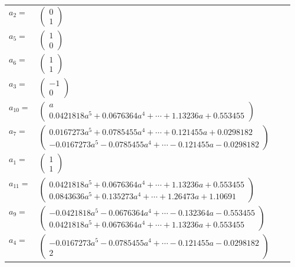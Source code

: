 \documentclass[1p]{elsarticle_modified}
\theoremstyle{definition}
\begin{document}
\begin{tabular}{m{7pt} m{180pt} m{7pt} m{180pt} }
\flushright $a_{2}=$&$\begin{pmatrix}0\\1\end{pmatrix}$ \\
\flushright $a_{5}=$&$\begin{pmatrix}1\\0\end{pmatrix}$ \\
\flushright $a_{6}=$&$\begin{pmatrix}1\\1\end{pmatrix}$ \\
\flushright $a_{3}=$&$\begin{pmatrix}-1\\0\end{pmatrix}$ \\
\flushright $a_{10}=$&$\begin{pmatrix}a\\0.0421818 a^{5}+0.0676364 a^{4}+\cdots+1.13236 a+0.553455\end{pmatrix}$ \\
\flushright $a_{7}=$&$\begin{pmatrix}0.0167273 a^{5}+0.0785455 a^{4}+\cdots+0.121455 a+0.0298182\\-0.0167273 a^{5}-0.0785455 a^{4}+\cdots-0.121455 a-0.0298182\end{pmatrix}$ \\
\flushright $a_{1}=$&$\begin{pmatrix}1\\1\end{pmatrix}$ \\
\flushright $a_{11}=$&$\begin{pmatrix}0.0421818 a^{5}+0.0676364 a^{4}+\cdots+1.13236 a+0.553455\\0.0843636 a^{5}+0.135273 a^{4}+\cdots+1.26473 a+1.10691\end{pmatrix}$ \\
\flushright $a_{9}=$&$\begin{pmatrix}-0.0421818 a^{5}-0.0676364 a^{4}+\cdots-0.132364 a-0.553455\\0.0421818 a^{5}+0.0676364 a^{4}+\cdots+1.13236 a+0.553455\end{pmatrix}$ \\
\flushright $a_{4}=$&$\begin{pmatrix}-0.0167273 a^{5}-0.0785455 a^{4}+\cdots-0.121455 a-0.0298182\\2\end{pmatrix}$ \\

\end{tabular}
\end{document}
